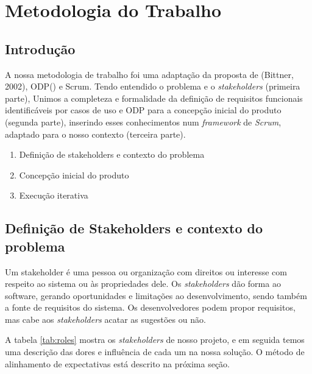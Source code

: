 \chapter{Metodologia do Trabalho}
    \section{Introdução}
        A nossa metodologia de trabalho foi uma adaptação da proposta de (Bittner, 2002)\cite{usecases}, ODP() e Scrum\cite{essentialscrum}. Tendo entendido o problema e o \textit{stakeholders} (primeira parte), Unimos a completeza e formalidade da definição de requisitos funcionais identificáveis por casos de uso e ODP para a concepção inicial do produto (segunda parte), inserindo esses conhecimentos num \textit{framework} de \textit{Scrum}, adaptado para o nosso contexto (terceira parte).
        
        \begin{enumerate}
            \item Definição de stakeholders e contexto do problema
            \item Concepção inicial do produto
            \item Execução iterativa
        \end{enumerate}

    \section{Definição de Stakeholders e contexto do pro\-ble\-ma}
        Um stakeholder é uma pessoa ou organização com direitos ou interesse com respeito ao sistema ou às propriedades dele. Os \textit{stakeholders} dão forma ao software, gerando oportunidades e limitações ao desenvolvimento, sendo também a fonte de requisitos do sistema. Os desenvolvedores podem propor requisitos, mas cabe aos \textit{stakeholders} acatar as sugestões ou não.

        A tabela \ref{tab:roles} mostra os \textit{stakeholders} de nosso projeto, e em seguida temos uma descrição das dores e influência de cada um na nossa solução. O método de alinhamento de expectativas está descrito na próxima seção.

